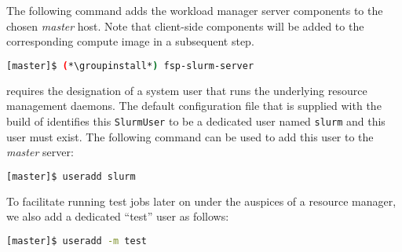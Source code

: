 The following command adds the \SLURM{} workload manager server components to the
chosen {\em master} host. Note that client-side components will be added to
the corresponding compute image in a subsequent step.

\begin{lstlisting}[language=bash,keywords={}]
[master]$ (*\groupinstall*) fsp-slurm-server
\end{lstlisting}

\SLURM{} requires the designation of a system user that runs the underlying
resource management daemons. The default configuration file that is supplied
with the \FSP{} build of \SLURM{} identifies this \texttt{SlurmUser} to be a
dedicated user named \texttt{slurm} and this user must exist. 
The following command can be used to add this user to the {\em
  master} server:

\begin{lstlisting}[language=bash,keywords={}]
[master]$ useradd slurm
\end{lstlisting}

To facilitate running test jobs later on under the auspices of a resource
manager, we also add a dedicated ``test'' user as follows:

\begin{lstlisting}[language=bash,keywords={}]
[master]$ useradd -m test
\end{lstlisting}


